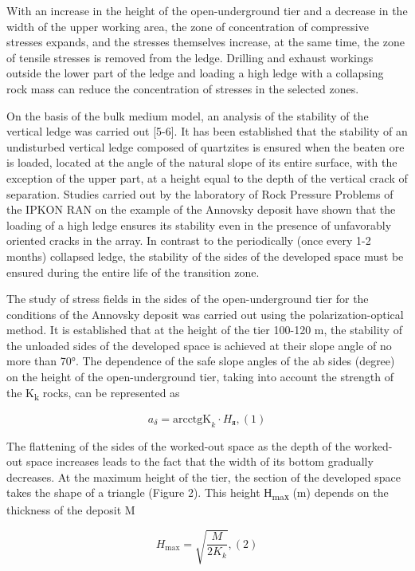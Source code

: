 \begin{multicols}{2}
With an increase in the height of the open-underground tier and a
decrease in the width of the upper working area, the zone of
concentration of compressive stresses expands, and the stresses
themselves increase, at the same time, the zone of tensile stresses is
removed from the ledge. Drilling and exhaust workings outside the lower
part of the ledge and loading a high ledge with a collapsing rock mass
can reduce the concentration of stresses in the selected zones.

On the basis of the bulk medium model, an analysis of the stability of
the vertical ledge was carried out {[}5-6{]}. It has been established
that the stability of an undisturbed vertical ledge composed of
quartzites is ensured when the beaten ore is loaded, located at the
angle of the natural slope of its entire surface, with the exception of
the upper part, at a height equal to the depth of the vertical crack of
separation. Studies carried out by the laboratory of Rock Pressure
Problems of the IPKON RAN on the example of the Annovsky deposit have
shown that the loading of a high ledge ensures its stability even in the
presence of unfavorably oriented cracks in the array. In contrast to the
periodically (once every 1-2 months) collapsed ledge, the stability of
the sides of the developed space must be ensured during the entire life
of the transition zone.

The study of stress fields in the sides of the open-underground tier for
the conditions of the Annovsky deposit was carried out using the
polarization-optical method. It is established that at the height of the
tier 100-120 m, the stability of the unloaded sides of the developed
space is achieved at their slope angle of no more than 70°. The
dependence of the safe slope angles of the ab sides (degree) on the
height of the open-underground tier, taking into account the strength of
the K\textsubscript{k} rocks, can be represented as

\[a_{\delta} = \text{arcctgK}_{k} \cdot H_{\text{я}},(1)\]

The flattening of the sides of the worked-out space as the depth of the
worked-out space increases leads to the fact that the width of its
bottom gradually decreases. At the maximum height of the tier, the
section of the developed space takes the shape of a triangle (Figure 2).
This height Н\textsubscript{maх} (m) depends on the thickness of the
deposit M

\[H_{\text{max}} = \sqrt{\frac{M}{2K_{k}}},(2)\]
\end{multicols}

